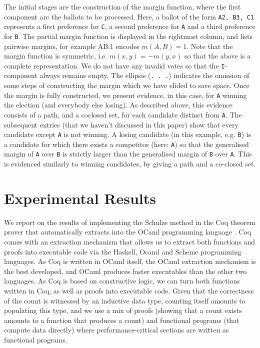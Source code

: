 \documentclass{llncs}
\begin{document}
\noindent
The initial stages are the construction of the margin function,
where the first component are the ballots to be processed. Here, a
ballot of the form \texttt{A2, B3, C1} represents a first preference
for \texttt{C}, a second preference for \texttt{A} and a third
preference for \texttt{B}. The partial margin function is displayed
in the rightmost column, and lists pairwise margins, for example 
AB:1 encodes $m(A,B) = 1$. Note that the
margin function is symmetric, i.e. $m(x, y) = -m(y, x)$ so that the
above is a complete representation. We
do not have any invalid votes so that the \texttt{I}-component
always remains empty.  The ellipsis (\texttt{. . .}) indicates the
omission of some steps of constructing the margin which we have 
elided to save space. Once the margin
is fully constructed, we present evidence, in this case, for
\texttt{A} winning the election (and everybody else losing). As
described above, this evidence consists of a path, and a coclosed
set, for each candidate distinct from \texttt{A}. The subsequent
entries (that we haven't discussed in this paper) show that every
candidate except \texttt{A} is not winning. A losing candidate (in
this example, e.g. \texttt{B}) is a
candidate for which there exists a competitor (here: \texttt{A}) so
that the generalised margin of \texttt{A} over \texttt{B} is
strictly larger than the generalised margin of \texttt{B} over
\texttt{A}. This is evidenced similarly to winning candidates, by
giving a path and a co-closed set.

\section{Experimental Results}

We report on the results of implementing the Schulze method in the
Coq theorem prover \cite{Bertot:2004:ITP} that automatically extracts into the
OCaml programming language \cite{Leroy:2016:OSR}. Coq comes with an
extraction mechanism \cite{Letouzey:2008:ECO} that allows us to
extract both functions and proofs into executable code via the
Haskell, Ocaml and Scheme programming languages. As Coq is written
in OCaml itself, the OCaml extraction mechanism is the best
developed, and OCaml produces faster executables than the other two
languages. As Coq is based on constructive logic, we can turn both
functions written in Coq, as well as proofs into executable code.
Given that the correctness of the count is witnessed by an inductive
data type, counting itself amounts to populating this type, and we
use a mix of proofs (showing that a count exists amounts to a
function that produces a count) and functional programs (that
compute data directly) where performance-critical sections are
written as functional programs.
\end{document}
